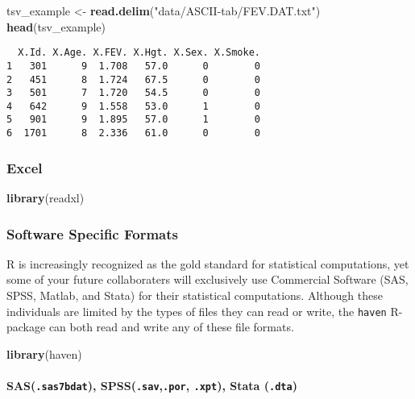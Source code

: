 \documentclass[]{book}
\newenvironment{Shaded}{\begin{snugshade}}{\end{snugshade}}
\newcommand{\KeywordTok}[1]{\textcolor[rgb]{0.13,0.29,0.53}{\textbf{#1}}}
\newcommand{\StringTok}[1]{\textcolor[rgb]{0.31,0.60,0.02}{#1}}
\newcommand{\NormalTok}[1]{#1}
\let\oldparagraph\paragraph
\renewcommand{\paragraph}[1]{\oldparagraph{#1}\mbox{}}
\theoremstyle{definition}
\theoremstyle{definition}
\theoremstyle{definition}
\theoremstyle{remark}
\begin{document}
\begin{Shaded}
\begin{Highlighting}[]
\NormalTok{tsv_example <-}\StringTok{ }\KeywordTok{read.delim}\NormalTok{(}\StringTok{"data/ASCII-tab/FEV.DAT.txt"}\NormalTok{)}
\KeywordTok{head}\NormalTok{(tsv_example)}
\end{Highlighting}
\end{Shaded}

\begin{verbatim}
  X.Id. X.Age. X.FEV. X.Hgt. X.Sex. X.Smoke.
1   301      9  1.708   57.0      0        0
2   451      8  1.724   67.5      0        0
3   501      7  1.720   54.5      0        0
4   642      9  1.558   53.0      1        0
5   901      9  1.895   57.0      1        0
6  1701      8  2.336   61.0      0        0
\end{verbatim}

\subsubsection{Excel}\label{excel}

\begin{Shaded}
\begin{Highlighting}[]
\KeywordTok{library}\NormalTok{(readxl)}
\end{Highlighting}
\end{Shaded}

\subsubsection{Software Specific
Formats}\label{software-specific-formats}

R is increasingly recognized as the gold standard for statistical
computations, yet some of your future collaboraters will exclusively use
Commercial Software (SAS, SPSS, Matlab, and Stata) for their statistical
computations. Although these individuals are limited by the types of
files they can read or write, the \texttt{haven} R-package can both read
and write any of these file formats.

\begin{Shaded}
\begin{Highlighting}[]
\KeywordTok{library}\NormalTok{(haven)}
\end{Highlighting}
\end{Shaded}

\paragraph{\texorpdfstring{SAS(\texttt{.sas7bdat}),
SPSS(\texttt{.sav},\texttt{.por}, \texttt{.xpt}), Stata
(\texttt{.dta})}{SAS(.sas7bdat), SPSS(.sav,.por, .xpt), Stata (.dta)}}\label{sas.sas7bdat-spss.sav.por-.xpt-stata-.dta}
\end{document}
